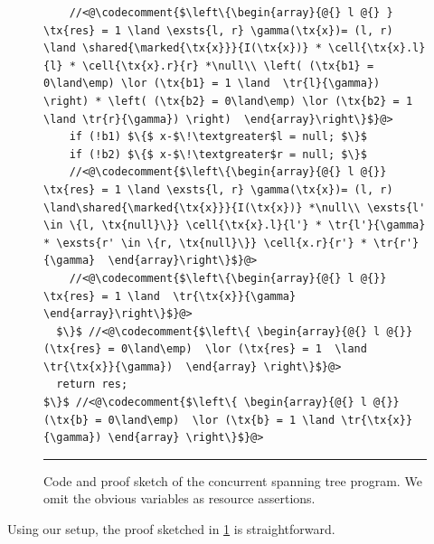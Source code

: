 \begin{figure}
\begin{lstlisting}
    //<@\codecomment{$\left\{\begin{array}{@{} l @{} } \tx{res} = 1 \land \exsts{l, r} \gamma(\tx{x})= (l, r) \land \shared{\marked{\tx{x}}}{I(\tx{x})} * \cell{\tx{x}.l}{l} * \cell{\tx{x}.r}{r} *\null\\ \left( (\tx{b1} = 0\land\emp) \lor (\tx{b1} = 1 \land  \tr{l}{\gamma}) \right) * \left( (\tx{b2} = 0\land\emp) \lor (\tx{b2} = 1 \land \tr{r}{\gamma}) \right)  \end{array}\right\}$}@>
    if (!b1) $\{$ x-$\!\textgreater$l = null; $\}$
    if (!b2) $\{$ x-$\!\textgreater$r = null; $\}$
    //<@\codecomment{$\left\{\begin{array}{@{} l @{}}  \tx{res} = 1 \land \exsts{l, r} \gamma(\tx{x})= (l, r) \land\shared{\marked{\tx{x}}}{I(\tx{x})} *\null\\ \exsts{l' \in \{l, \tx{null}\}} \cell{\tx{x}.l}{l'} * \tr{l'}{\gamma} * \exsts{r' \in \{r, \tx{null}\}} \cell{x.r}{r'} * \tr{r'}{\gamma}  \end{array}\right\}$}@>
    //<@\codecomment{$\left\{\begin{array}{@{} l @{}} \tx{res} = 1 \land  \tr{\tx{x}}{\gamma}    \end{array}\right\}$}@>
  $\}$ //<@\codecomment{$\left\{ \begin{array}{@{} l @{}} (\tx{res} = 0\land\emp)  \lor (\tx{res} = 1  \land \tr{\tx{x}}{\gamma})  \end{array} \right\}$}@>
  return res;
$\}$ //<@\codecomment{$\left\{ \begin{array}{@{} l @{}} (\tx{b} = 0\land\emp)  \lor (\tx{b} = 1 \land \tr{\tx{x}}{\gamma}) \end{array} \right\}$}@>
\end{lstlisting}
\hrule\vspace*{-6pt}
\caption{Code and proof sketch of the concurrent spanning tree
  program. We omit the obvious variables as resource assertions.}
\label{fig:conSpanningTree}
\end{figure}

Using our setup, the proof sketched in \fig\ref{fig:conSpanningTree}
is straightforward.

